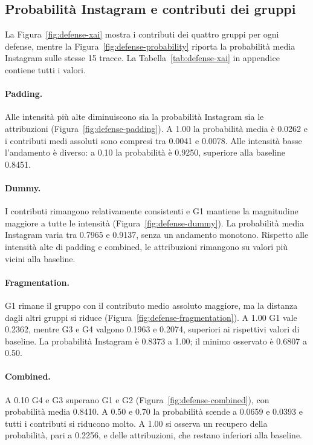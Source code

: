 \documentclass[11pt,a4paper]{article}
\begin{document}
\subsection{Probabilità Instagram e contributi dei gruppi}
La Figura~\ref{fig:defense-xai} mostra i contributi dei quattro gruppi per ogni defense, mentre la Figura~\ref{fig:defense-probability} riporta la probabilità media Instagram sulle stesse 15 tracce. La Tabella~\ref{tab:defense-xai} in appendice contiene tutti i valori.

\paragraph{Padding.}
Alle intensità più alte diminuiscono sia la probabilità Instagram sia le attribuzioni (Figura~\ref{fig:defense-padding}). A 1.00 la probabilità media è 0.0262 e i contributi medi assoluti sono compresi tra 0.0041 e 0.0078. Alle intensità basse l'andamento è diverso: a 0.10 la probabilità è 0.9250, superiore alla baseline 0.8451.

\paragraph{Dummy.}
I contributi rimangono relativamente consistenti e G1 mantiene la magnitudine maggiore a tutte le intensità (Figura~\ref{fig:defense-dummy}). La probabilità media Instagram varia tra 0.7965 e 0.9137, senza un andamento monotono. Rispetto alle intensità alte di padding e combined, le attribuzioni rimangono su valori più vicini alla baseline.

\paragraph{Fragmentation.}
G1 rimane il gruppo con il contributo medio assoluto maggiore, ma la distanza dagli altri gruppi si riduce (Figura~\ref{fig:defense-fragmentation}). A 1.00 G1 vale 0.2362, mentre G3 e G4 valgono 0.1963 e 0.2074, superiori ai rispettivi valori di baseline. La probabilità Instagram è 0.8373 a 1.00; il minimo osservato è 0.6807 a 0.50.

\paragraph{Combined.}
A 0.10 G4 e G3 superano G1 e G2 (Figura~\ref{fig:defense-combined}), con probabilità media 0.8410. A 0.50 e 0.70 la probabilità scende a 0.0659 e 0.0393 e tutti i contributi si riducono molto. A 1.00 si osserva un recupero della probabilità, pari a 0.2256, e delle attribuzioni, che restano inferiori alla baseline.
\end{document}
